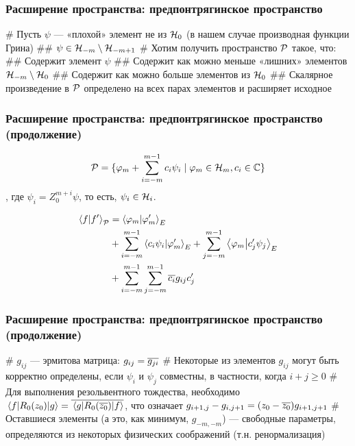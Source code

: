 \documentclass{beamer}
\begin{document}
\begin{frame}[fragile]
\frametitle{Расширение пространства: предпонтрягинское пространство}
\begin{easylist}[itemize]
# Пусть $\psi$ — «плохой» элемент не из $\mathcal{H}_{0}$ (в нашем случае производная функции Грина)
## $\psi \in \mathcal{H}_{-m} \setminus \mathcal{H}_{-m + 1}$ 
# Хотим получить пространство $\mathcal{P}$ такое, что:
## Содержит элемент $\psi$
## Содержит как можно меньше «лишних» элементов $\mathcal{H}_{-m} \setminus \mathcal{H}_{0}$
## Содержит как можно больше элементов из $\mathcal{H}_{0}$
## Скалярное произведение в $\mathcal{P}$ определено на всех парах элементов и расширяет исходное
\end{easylist}
\end{frame}

\begin{frame}[fragile]
\frametitle{Расширение пространства: предпонтрягинское пространство (продолжение)}
\[
\mathcal{P} = 
\{ \varphi_m + \sum\limits_{i = -m}^{m - 1} c_i \psi_i \mid \varphi_m \in \mathcal{H}_{m}, c_i \in \mathbb{C}\}
\]
, где $\psi_i = Z_0^{m + i} \psi$, то есть, $\psi_i \in \mathcal{H}_{i}$.

\begin{align*}
\ip{f}{f'}_{\mcP}
&= \ip{\varphi_m}{\varphi'_m}_E \\
&+ \sum\limits_{i = -m}^{m - 1} \ip{c_i \psi_i}{\varphi'_m}_E + \sum\limits_{j = -m}^{m - 1} \ip{\varphi_m}{c_j' \psi_j}_E \\
&+ \sum\limits_{i = -m}^{m - 1} \sum\limits_{j = -m}^{m - 1} \cconj{c_i} g_{ij} c_j'
\end{align*}
\end{frame}

\begin{frame}[fragile]
\frametitle{Расширение пространства: предпонтрягинское пространство (продолжение)}
\begin{easylist}[itemize]
# $g_{ij}$ — эрмитова матрица: $g_{ij} = \overline{g_{ji}}$
# Некоторые из элементов $g_{ij}$ могут быть корректно определены, если $\psi_i$ и $\psi_j$ совместны, в частности, когда $i + j \ge 0$
# Для выполнения резольвентного тождества, необходимо $\mel{f}{R_0(z_0)}{g} = \overline{\mel{g}{R_0(\overline{z_0})}{f}}$, что означает
$g_{i + 1, j} - g_{i, j + 1} = (z_0 - \overline{z_0}) g_{i + 1, j + 1}$
# Оставшиеся элементы (а это, как минимум, $g_{-m, -m}$) — свободные параметры, определяются из некоторых физических соображений (т.н. ренормализация)
\end{easylist}
\end{frame}
\end{document}
